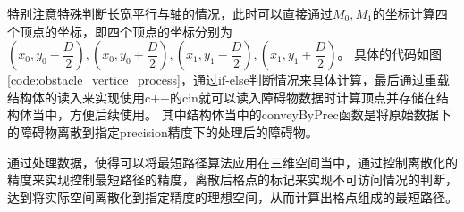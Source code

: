 \par 特别注意特殊判断长宽平行与轴的情况，此时可以直接通过$M_0,M_1$的坐标计算四个顶点的坐标，即四个顶点的坐标分别为$(x_0,y_0-\dfrac{D}{2}),(x_0,y_0+\dfrac{D}{2}),(x_1,y_1-\dfrac{D}{2}),(x_1,y_1+\dfrac{D}{2})$。
具体的代码如图\ref{code:obstacle_vertice_process}，通过if-else判断情况来具体计算，最后通过重载结构体的读入来实现使用c++的cin就可以读入障碍物数据时计算顶点并存储在结构体当中，方便后续使用。
其中结构体当中的conveyByPrec函数是将原始数据下的障碍物离散到指定precision精度下的处理后的障碍物。

\par 通过处理数据，使得可以将最短路径算法应用在三维空间当中，通过控制离散化的精度来实现控制最短路径的精度，离散后格点的标记来实现不可访问情况的判断，达到将实际空间离散化到指定精度的理想空间，从而计算出格点组成的最短路径。

